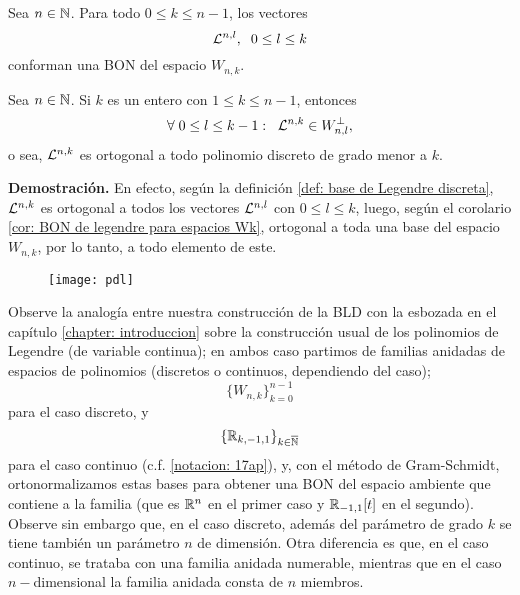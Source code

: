 \begin{cor} \label{cor: BON de legendre para espacios Wk}
Sea $n \in \mathbb{N}$. Para todo $0 \leq k \leq n-1$, los vectores
\[
\mathcal{L}^{n, l}, \hspace{0.2cm} 0 \leq l \leq k
\]
conforman una BON del espacio $W_{n,k}$.
\end{cor}

\begin{cor} \label{cor: Ln,k ortogonal a todo pol discreto de grado menor a k}
Sea $n \in \mathbb{N}$. Si $k$ es un entero con $1 \leq k \leq n-1$,
entonces
\[
\forall \hspace{0.1cm} 0 \leq l \leq k-1:
\hspace{0.2cm}
\mathcal{L}^{n,k} \in W_{n,l}^{\perp},
\]
o sea, 
$\mathcal{L}^{n,k}$ es ortogonal a todo polinomio discreto
de grado menor a $k$.
\end{cor}
\noindent
\textbf{Demostración.}
En efecto, según la definición
\ref{def: base de Legendre discreta}, 
$\mathcal{L}^{n,k}$ es ortogonal a todos los vectores
$\mathcal{L}^{n, l}$ con $0 \leq l \leq k$,
luego, según el corolario
\ref{cor: BON de legendre para espacios Wk},
ortogonal a toda una base del espacio $W_{n,k}$,
por lo tanto, a todo elemento de este.
\QEDB
\vspace{0.2cm}



\begin{figure}[H]
	\centering
	\texttt{[image: pdl]} 
\end{figure}	


\begin{nota}
Observe la analogía entre nuestra construcción de la BLD
con la esbozada en el capítulo 
\ref{chapter: introduccion} sobre la construcción 
usual de los polinomios
de Legendre (de variable continua);
en ambos caso partimos de familias anidadas de espacios 
de polinomios
(discretos o continuos, dependiendo del caso);
	\[
	\{ W_{n,k} \}_{k=0}^{n-1} 
	\]
para el caso discreto, y
	\[
	\{ \mathbb{R}_{k,-1,1} \}_{k \in \overline{\mathbb{N}}}
	\]	
para el caso continuo (c.f. \ref{notacion: 17ap}),
y, con el 
método de Gram-Schmidt, ortonormalizamos estas bases para obtener
una BON del espacio ambiente que contiene a la familia
(que es $\mathbb{R}^{n}$ en el primer caso y $\mathbb{R}_{-1,1}[t]$
en el segundo). \\

Observe sin embargo que, en el caso discreto, además
del parámetro de grado $k$ se tiene también un parámetro
$n$ de dimensión. Otra diferencia es que, en el caso 
continuo, se trataba con una familia anidada numerable, mientras
que en el caso $n-$dimensional la familia anidada consta
de $n$ miembros.
\end{nota}



